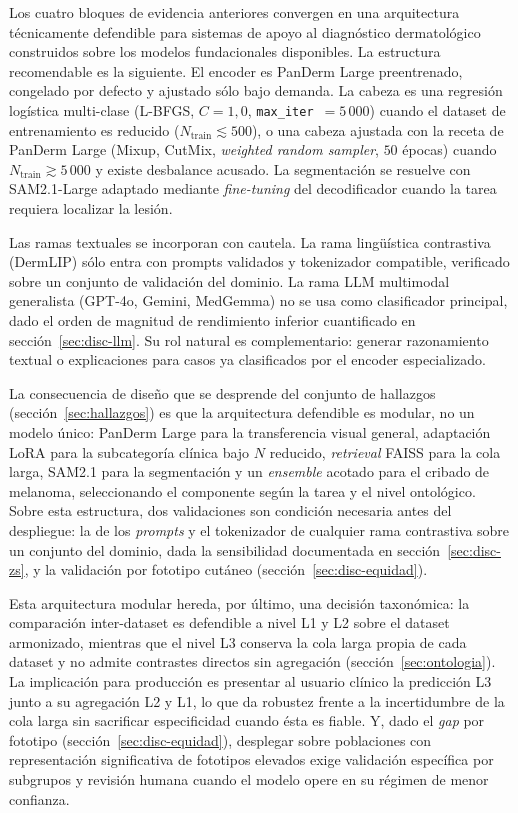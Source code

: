 Los cuatro bloques de evidencia anteriores convergen en una
arquitectura técnicamente defendible para sistemas de apoyo al
diagnóstico dermatológico construidos sobre los modelos
fundacionales disponibles. La estructura recomendable es la
siguiente. El encoder es PanDerm Large preentrenado, congelado por
defecto y ajustado sólo bajo demanda. La cabeza es una regresión
logística multi-clase (L-BFGS, $C=1{,}0$,
\texttt{max\_iter}~$=5\,000$) cuando el dataset de entrenamiento es
reducido ($N_{\mathrm{train}} \lesssim 500$), o una cabeza
ajustada con la receta de PanDerm Large (Mixup, CutMix,
\emph{weighted random sampler}, $50$ épocas) cuando
$N_{\mathrm{train}} \gtrsim 5\,000$ y existe desbalance acusado.
La segmentación se resuelve con SAM2.1-Large adaptado mediante
\emph{fine-tuning} del decodificador cuando la tarea requiera
localizar la lesión.

Las ramas textuales se incorporan con cautela. La rama lingüística
contrastiva (DermLIP) sólo entra con prompts validados y tokenizador
compatible, verificado sobre un conjunto de validación del dominio.
La rama LLM multimodal generalista (GPT-4o, Gemini, MedGemma) no se
usa como clasificador principal, dado el orden de magnitud de
rendimiento inferior cuantificado en sección~\ref{sec:disc-llm}.
Su rol natural es complementario: generar razonamiento textual o
explicaciones para casos ya clasificados por el encoder
especializado.

La consecuencia de diseño que se desprende del conjunto de hallazgos
(sección~\ref{sec:hallazgos}) es que la arquitectura defendible es
modular, no un modelo único: PanDerm Large para la transferencia visual
general, adaptación LoRA para la subcategoría clínica bajo $N$ reducido,
\emph{retrieval} FAISS para la cola larga, SAM2.1 para la segmentación y
un \emph{ensemble} acotado para el cribado de melanoma, seleccionando el
componente según la tarea y el nivel ontológico. Sobre esta estructura,
dos validaciones son condición necesaria antes del despliegue: la de los
\emph{prompts} y el tokenizador de cualquier rama contrastiva sobre un
conjunto del dominio, dada la sensibilidad documentada en
sección~\ref{sec:disc-zs}, y la validación por fototipo cutáneo
(sección~\ref{sec:disc-equidad}).

Esta arquitectura modular hereda, por último, una decisión taxonómica:
la comparación inter-dataset es defendible a nivel L1 y L2 sobre el
dataset armonizado, mientras que el nivel L3 conserva la cola larga
propia de cada dataset y no admite contrastes directos sin agregación
(sección~\ref{sec:ontologia}). La implicación para producción es
presentar al usuario clínico la predicción L3 junto a su agregación L2 y
L1, lo que da robustez frente a la incertidumbre de la cola larga sin
sacrificar especificidad cuando ésta es fiable. Y, dado el \emph{gap}
por fototipo (sección~\ref{sec:disc-equidad}), desplegar sobre
poblaciones con representación significativa de fototipos elevados exige
validación específica por subgrupos y revisión humana cuando el modelo
opere en su régimen de menor confianza.

